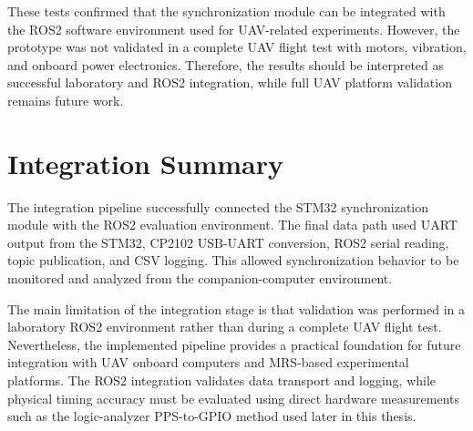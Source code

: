 These tests confirmed that the synchronization module can be integrated with the ROS2 software environment used for UAV-related experiments. However, the prototype was not validated in a complete UAV flight test with motors, vibration, and onboard power electronics. Therefore, the results should be interpreted as successful laboratory and ROS2 integration, while full UAV platform validation remains future work.

\section{Integration Summary}

The integration pipeline successfully connected the STM32 synchronization module with the ROS2 evaluation environment. The final data path used UART output from the STM32, CP2102 USB-UART conversion, ROS2 serial reading, topic publication, and CSV logging. This allowed synchronization behavior to be monitored and analyzed from the companion-computer environment.

The main limitation of the integration stage is that validation was performed in a laboratory ROS2 environment rather than during a complete UAV flight test. Nevertheless, the implemented pipeline provides a practical foundation for future integration with UAV onboard computers and MRS-based experimental platforms. The ROS2 integration validates data transport and logging, while physical timing accuracy must be evaluated using direct hardware measurements such as the logic-analyzer PPS-to-GPIO method used later in this thesis.

